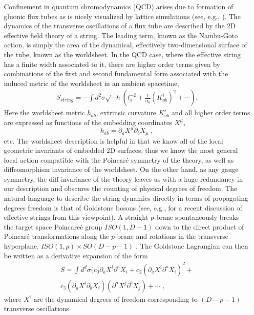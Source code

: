 \documentclass[%
 reprint,
 amsmath,amssymb,
 aps,
]{revtex4-1}
\begin{document}
Confinement in quantum chromodynamics (QCD) arises due to formation of
gluonic flux tubes as is nicely visualized by lattice simulations (see, e.g.,  \cite{Bissey:2006bz}).
The dynamics of the transverse oscillations of a flux tube are
described by the 2D effective field theory of a string. The leading term, known as the
Nambu-Goto action, is simply the area of the dynamical, effectively two-dimensional surface
of the tube, known as the worldsheet. In the QCD case, where the effective string has a finite
width associated to it, there are higher order terms given by combinations of the first
and second fundamental form associated with the induced metric
 of the worldsheet in an
ambient spacetime,
\begin{eqnarray}
\label{diffaction}
    S_{string} = - \int d^2 \sigma \sqrt{- h} \left(
    l_s^{-2} + \frac{1}{\alpha_0} (K^i_{ab})^2 + \cdots \right).
\end{eqnarray}
Here the worldsheet metric $h_{ab}$, extrinsic curvature $K^i_{ab}$ and all higher order terms are expressed as functions of the embedding coordinates $X^\mu$,
\[
h_{ab}=\partial_a X^\mu\partial_bX_\mu\;,
\]
etc.
The worldsheet description is helpful in that we know all
of the local geometric invariants of embedded 2D surfaces, thus we know the most general
local action compatible with the Poincar\'e symmetry of the theory, as
well as diffeomorphism invariance of the worldsheet. On the other hand, as any gauge symmetry, the
diff invariance of the theory leaves us with a huge redundancy in our description and obscures the counting of physical degrees of freedom.
 The natural language to describe the string dynamics directly in terms of propagating degrees freedom  is that of Goldstone bosons
 (see, e.g., \cite{Dubovsky:2012sh} for a recent discussion of effective strings from this viewpoint).
 A  straight $p$-brane spontaneously breaks the target space Poincare\'e group $ISO(1,D-1)$ down to the direct product of Poincar\'e
 transformations along the $p$-brane and rotations in the transverse hyperplane,
  $ISO(1,p)\times SO(D-p-1)$ . The Goldstone Lagrangian can then be written
as a derivative expansion of the form
\begin{eqnarray}
\label{action}
    S =  \int d^d \sigma (c_0 \partial_a X^i \partial^a X_i +
    c_2 (\partial_a X^i \partial^a X_i)^2 +  \\
    c_3 (\partial_a X^i \partial_b X_i)(\partial^a X^j \partial^b X_j) + \cdots \; , \nonumber
\end{eqnarray}
where $X^i$ are
the dynamical degrees of freedom  corresponding to  $(D-p-1)$ transverse oscillations
\end{document}
